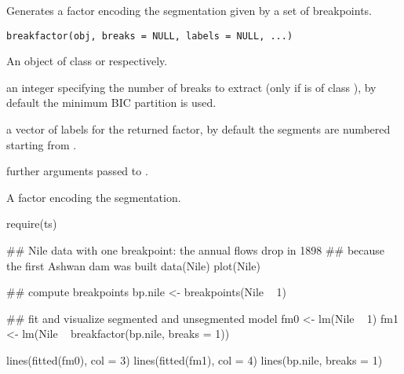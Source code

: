 \begin{Description}\relax
Generates a factor encoding the segmentation given by
a set of breakpoints.\end{Description}
\begin{Usage}
\begin{verbatim}
breakfactor(obj, breaks = NULL, labels = NULL, ...)
\end{verbatim}
\end{Usage}
\begin{Arguments}
\begin{ldescription}
\item[\code{obj}] An object of class  or
 respectively.
\item[\code{breaks}] an integer specifying the number of breaks
to extract (only if  is of class ),
by default the minimum BIC partition is used.
\item[\code{labels}] a vector of labels for the returned factor,
by default the segments are numbered starting from
.
\item[\code{...}] further arguments passed to .
\end{ldescription}
\end{Arguments}
\begin{Value}
A factor encoding the segmentation.\end{Value}
\begin{SeeAlso}\relax
{}\end{SeeAlso}
\begin{Examples}
\begin{ExampleCode}
require(ts)

## Nile data with one breakpoint: the annual flows drop in 1898
## because the first Ashwan dam was built
data(Nile)
plot(Nile)

## compute breakpoints
bp.nile <- breakpoints(Nile ~ 1)

## fit and visualize segmented and unsegmented model
fm0 <- lm(Nile ~ 1)
fm1 <- lm(Nile ~ breakfactor(bp.nile, breaks = 1))

lines(fitted(fm0), col = 3)
lines(fitted(fm1), col = 4)
lines(bp.nile, breaks = 1)
\end{ExampleCode}
\end{Examples}

